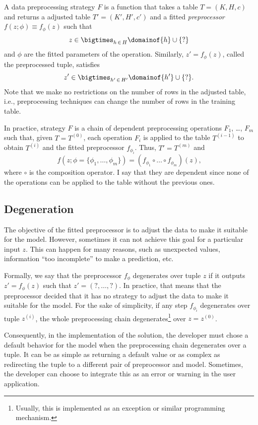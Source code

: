 A data preprocessing strategy $F$ is a function that takes a table $T = (K, H, c)$ and
returns a adjusted table $T' = (K', H', c')$ and a fitted \emph{preprocessor} $f(z; \phi)
\equiv f_\phi(z)$ such that $$z \in \bigtimes_{h\, \in\, H} \domainof{h} \cup \{?\}$$ and $\phi$ are
the fitted parameters of the operation.  Similarly, $z' = f_\phi(z)$, called the
preprocessed tuple, satisfies $$z' \in \bigtimes_{h'\, \in\, H'} \domainof{h'} \cup
\{?\}\text{.}$$ Note that we make no restrictions on the number of rows in the adjusted
table, i.e., preprocessing techniques can change the number of rows in the training table.

In practice, strategy $F$ is a chain of dependent preprocessing operations $F_1$, \dots,
$F_m$ such that, given $T = T^{(0)}$, each operation $F_i$ is applied to the table
$T^{(i-1)}$ to obtain $T^{(i)}$ and the fitted preprocessor $f_{\phi_i}$.  Thus, $T' =
T^{(m)}$ and $$f(z; \phi = \{\phi_1, \dots, \phi_m\}) = \left(f_{\phi_1} \circ \dots \circ
f_{\phi_m}\right)(z)\text{,}$$ where $\circ$ is the composition operator.  I say that
they are dependent since none of the operations can be applied to the table without the
previous ones.

\subsection{Degeneration}

The objective of the fitted preprocessor is to adjust the data to make it suitable for the
model.  However, sometimes it can not achieve this goal for a particular input $z$.  This
can happen for many reasons, such as unexpected values, information ``too incomplete'' to
make a prediction, etc.

Formally, we say that the preprocessor $f_\phi$ degenerates over tuple $z$ if it outputs
$z' = f_\phi(z)$ such that $z' = (?, \dots, ?)$.  In practice, that means that the
preprocessor decided that it has no strategy to adjust the data to make it suitable for
the model.  For the sake of simplicity, if any step $f_{\phi_i}$ degenerates over
tuple $z^{(i)}$, the whole preprocessing chain degenerates\footnote{Usually, this is
implemented as an exception or similar programming mechanism.} over $z = z^{(0)}$.

Consequently, in the implementation of the solution, the developer must chose a default
behavior for the model when the preprocessing chain degenerates over a tuple.  It can
be as simple as returning a default value or as complex as redirecting the tuple to a
different pair of preprocessor and model.  Sometimes, the developer can choose to
integrate this as an error or warning in the user application.


